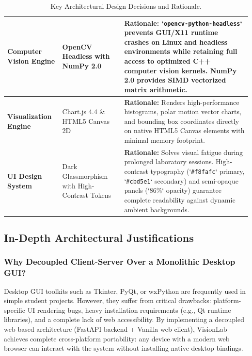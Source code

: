 \begin{table}[htbp]
\begin{tabularx}{\textwidth}{|p{3.2cm}|p{3.0cm}|X|}
        \hline
        \textbf{Computer Vision Engine} & OpenCV Headless with NumPy 2.0 & \textbf{Rationale:} `\texttt{opencv-python-headless}` prevents GUI/X11 runtime crashes on Linux and headless environments while retaining full access to optimized C++ computer vision kernels. NumPy 2.0 provides SIMD vectorized matrix arithmetic. \\
        \hline
        \textbf{Visualization Engine} & Chart.js 4.4 \& HTML5 Canvas 2D & \textbf{Rationale:} Renders high-performance histograms, polar motion vector charts, and bounding box coordinates directly on native HTML5 Canvas elements with minimal memory footprint. \\
        \hline
        \textbf{UI Design System} & Dark Glassmorphism with High-Contrast Tokens & \textbf{Rationale:} Solves visual fatigue during prolonged laboratory sessions. High-contrast typography (`\texttt{\#f8fafc}` primary, `\texttt{\#cbd5e1}` secondary) and semi-opaque panels (`$86\%$` opacity) guarantee complete readability against dynamic ambient backgrounds. \\
        \hline
    \end{tabularx}
    \caption{Key Architectural Design Decisions and Rationale.}
    \label{tab:design_decisions}
\end{table}

\subsection{In-Depth Architectural Justifications}

\subsubsection{Why Decoupled Client-Server Over a Monolithic Desktop GUI?}
Desktop GUI toolkits such as Tkinter, PyQt, or wxPython are frequently used in simple student projects. However, they suffer from critical drawbacks: platform-specific UI rendering bugs, heavy installation requirements (e.g., Qt runtime libraries), and a complete lack of web accessibility. By implementing a decoupled web-based architecture (FastAPI backend + Vanilla web client), VisionLab achieves complete cross-platform portability: any device with a modern web browser can interact with the system without installing native desktop bindings.

